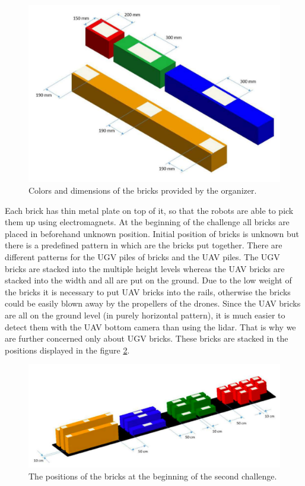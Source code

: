 \begin{figure}[H]

\centering
\includegraphics[scale=0.35]{fig/brick_sample.png}
\caption[Bricks definition]{Colors and dimensions of the bricks provided by the organizer.}
\label{fig:brickdef}

\end{figure}

Each brick has thin metal plate on top of it, so that the robots are able to pick them up using electromagnets. At the beginning of the challenge all bricks are placed in beforehand unknown position. Initial position of bricks is unknown but there is a predefined pattern in which are the bricks put together. There are different patterns for the UGV piles of bricks and the UAV piles. The UGV bricks are stacked into the multiple height levels whereas the UAV bricks are stacked into the width and all are put on the ground. Due to the low weight of the bricks it is necessary to put UAV bricks into the rails, otherwise the bricks could be easily blown away by the propellers of the drones. Since the UAV bricks are all on the ground level (in purely horizontal pattern), it is much easier to detect them with the UAV bottom camera than using the lidar. That is why we are further concerned only about UGV bricks. These bricks are stacked in the positions displayed in the figure \ref{fig:piledef}.

\begin{figure}[H]

\centering
\includegraphics[scale=0.35]{fig/initial_layout.png}
\caption[Initial brick layout]{The positions of the bricks at the beginning of the second challenge.}
\label{fig:piledef}

\end{figure}

